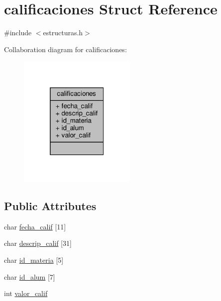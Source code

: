 \hypertarget{structcalificaciones}{}\section{calificaciones Struct Reference}
\label{structcalificaciones}


{\ttfamily \#include $<$estructuras.\+h$>$}



Collaboration diagram for calificaciones\+:\nopagebreak
\begin{figure}[H]
\begin{center}
\leavevmode
\includegraphics[width=160pt]{structcalificaciones__coll__graph}
\end{center}
\end{figure}
\subsection*{Public Attributes}
\begin{DoxyCompactItemize}
\item 
char \mbox{\hyperlink{structcalificaciones_ae8e8df42a01eb0f08c1e28d0b3b719e4}{fecha\+\_\+calif}} \mbox{[}11\mbox{]}
\item 
char \mbox{\hyperlink{structcalificaciones_a4da5aee40f1cbe0d2cf2a19a2d62cd90}{descrip\+\_\+calif}} \mbox{[}31\mbox{]}
\item 
char \mbox{\hyperlink{structcalificaciones_ab3e1ecafa94442f9ea47eee45208b08b}{id\+\_\+materia}} \mbox{[}5\mbox{]}
\item 
char \mbox{\hyperlink{structcalificaciones_a25420b2789fc7452fd044ca3b318ed92}{id\+\_\+alum}} \mbox{[}7\mbox{]}
\item 
int \mbox{\hyperlink{structcalificaciones_af79ae6ed55e0fc1bfd9746b78b75fa6c}{valor\+\_\+calif}}
\end{DoxyCompactItemize}


